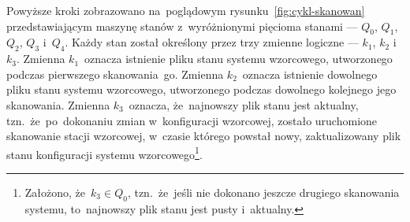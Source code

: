 \documentclass[thesis]{subfiles}
\begin{document}

Powyższe kroki zobrazowano na~poglądowym rysunku~\ref{fig:cykl-skanowan} przedstawiającym maszynę stanów z~wyróżnionymi pięcioma stanami --- $Q_0$, $Q_1$, $Q_2$, $Q_3$ i~$Q_4$. Każdy stan został określony przez trzy zmienne logiczne --- $k_1$, $k_2$ i~$k_3$. Zmienna $k_1$~oznacza istnienie pliku stanu systemu wzorcowego, utworzonego podczas pierwszego skanowania~go. Zmienna $k_2$~oznacza istnienie dowolnego pliku stanu systemu wzorcowego, utworzonego podczas dowolnego kolejnego jego skanowania. Zmienna $k_3$~oznacza, że~najnowszy plik stanu jest aktualny, tzn.~że~po~dokonaniu zmian w~konfiguracji wzorcowej, zostało uruchomione skanowanie stacji wzorcowej, w~czasie którego powstał nowy, zaktualizowany plik stanu konfiguracji systemu wzorcowego\footnote{Założono, że~$k_3\in Q_0$, tzn.~że~jeśli nie dokonano jeszcze drugiego skanowania systemu, to~najnowszy plik stanu jest pusty i~aktualny.}.
\end{document}
